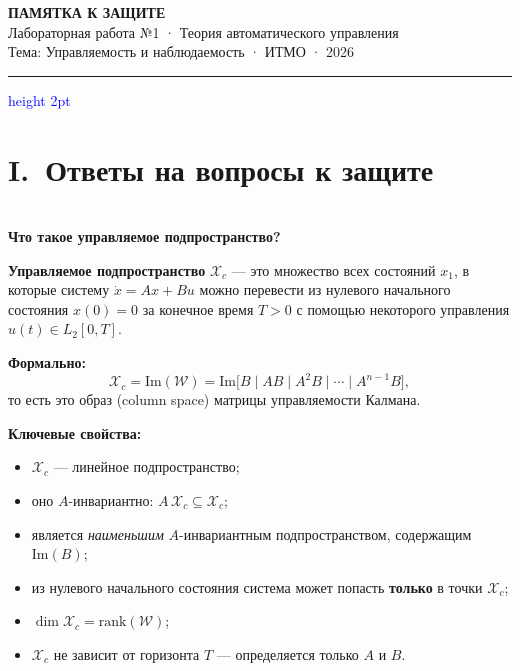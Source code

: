 \documentclass[12pt,a4paper]{article}
\begin{document}
	
	\begin{center}
		{\LARGE\bfseries\color{navy} ПАМЯТКА К ЗАЩИТЕ}\\[6pt]
		{\large\color{dgray} Лабораторная работа №1 · Теория автоматического управления}\\[4pt]
		{\normalsize\color{dgray} Тема: Управляемость и наблюдаемость · ИТМО · 2026}
	\end{center}
	\textcolor{blue}{\hrule height 2pt}
	\vspace{8pt}
	
	\section{I.~Ответы на вопросы к защите}
	
	\begin{qblock}
		\\
		{\bfseries Что такое управляемое подпространство?}
		
		\medskip
		\textbf{Управляемое подпространство} $\mathcal{X}_c$ --- это множество всех состояний $x_1$,
		в которые систему $\dot{x} = Ax + Bu$ можно перевести из нулевого начального состояния
		$x(0)=0$ за конечное время $T>0$ с помощью некоторого управления $u(t) \in L_2[0,T]$.
		
		\medskip
		\textbf{Формально:}
		\[
		\mathcal{X}_c = \mathrm{Im}(\mathcal{W}) = \mathrm{Im}\!\bigl[B \mid AB \mid A^2B \mid \cdots \mid A^{n-1}B\bigr],
		\]
		то есть это образ (column space) матрицы управляемости Калмана.
		
		\medskip
		\textbf{Ключевые свойства:}
		\begin{itemize}[leftmargin=20pt, itemsep=2pt]
			\item $\mathcal{X}_c$ --- линейное подпространство;
			\item оно $A$-инвариантно: $A\,\mathcal{X}_c \subseteq \mathcal{X}_c$;
			\item является \emph{наименьшим} $A$-инвариантным подпространством, содержащим $\mathrm{Im}(B)$;
			\item из нулевого начального состояния система может попасть \textbf{только} в точки $\mathcal{X}_c$;
			\item $\dim \mathcal{X}_c = \mathrm{rank}(\mathcal{W})$;
			\item $\mathcal{X}_c$ не зависит от горизонта $T$ --- определяется только $A$ и $B$.
		\end{itemize}
	\end{qblock}
	
\end{document}
